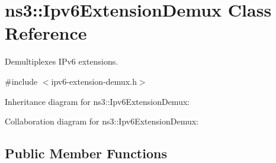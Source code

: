 \hypertarget{classns3_1_1Ipv6ExtensionDemux}{}\section{ns3\+:\+:Ipv6\+Extension\+Demux Class Reference}
\label{classns3_1_1Ipv6ExtensionDemux}


Demultiplexes I\+Pv6 extensions.  




{\ttfamily \#include $<$ipv6-\/extension-\/demux.\+h$>$}



Inheritance diagram for ns3\+:\+:Ipv6\+Extension\+Demux\+:


Collaboration diagram for ns3\+:\+:Ipv6\+Extension\+Demux\+:
\subsection*{Public Member Functions}
